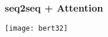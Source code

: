 \begin{frame}[fragile]\frametitle{seq2seq + Attention}

\begin{center}
\texttt{[image: bert32]}
\end{center}	

\end{frame}









